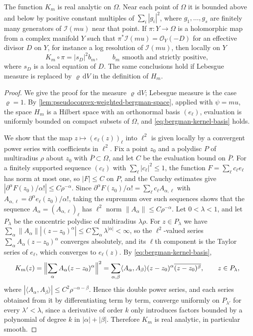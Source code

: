 \begin{lemma}\label{lem:bergman-smoothness-and-resolution}
The function $K_m$ is real analytic on $\Omega$. Near each point of $\Omega$ it is bounded above and below by positive constant multiples of $\sum_i|g_i|^2$, where $g_1,\ldots,g_s$ are finitely many generators of $\mathcal I(mu)$ near that point. If $\pi\colon Y\to\Omega$ is a holomorphic map from a complex manifold $Y$ such that $\pi^*\mathcal I(mu)=\mathcal O_Y(-D)$ for an effective divisor $D$ on $Y$, for instance a log resolution of $\mathcal I(mu)$, then locally on $Y$
\[
 K_m\circ\pi=|s_D|^2b_m,\qquad b_m\text{ smooth and strictly positive},
\]
where $s_D$ is a local equation of $D$. The same conclusions hold if Lebesgue measure is replaced by $\varrho\,\mathrm dV$ in the definition of $H_m$.
\end{lemma}
\begin{proof}
We give the proof for the measure $\varrho\,\mathrm dV$; Lebesgue measure is the case $\varrho=1$. By \cref{lem:pseudoconvex-weighted-bergman-space}, applied with $\psi=mu$, the space $H_m$ is a Hilbert space with an orthonormal basis $(e_\ell)$, evaluation is uniformly bounded on compact subsets of $\Omega$, and \eqref{eq:bergman-kernel-basis} holds.

We show that the map $z\mapsto(e_\ell(z))_\ell$ into $\ell^2$ is given locally by a convergent power series with coefficients in $\ell^2$. Fix a point $z_0$ and a polydisc $P$ of multiradius $\rho$ about $z_0$ with $\overline P\subset\Omega$, and let $C$ be the evaluation bound on $\overline P$. For a finitely supported sequence $(c_\ell)$ with $\sum_\ell|c_\ell|^2\leq1$, the function $F=\sum_\ell c_\ell e_\ell$ has norm at most one, so $|F|\leq C$ on $P$, and the Cauchy estimates give $|\partial^\alpha F(z_0)/\alpha!|\leq C\rho^{-\alpha}$. Since $\partial^\alpha F(z_0)/\alpha!=\sum_\ell c_\ell A_{\alpha,\ell}$ with $A_{\alpha,\ell}=\partial^\alpha e_\ell(z_0)/\alpha!$, taking the supremum over such sequences shows that the sequence $A_\alpha=(A_{\alpha,\ell})_\ell$ has $\ell^2$ norm $\|A_\alpha\|\leq C\rho^{-\alpha}$. Let $0<\lambda<1$, and let $P_\lambda$ be the concentric polydisc of multiradius $\lambda\rho$. For $z\in P_\lambda$ we have $\sum_\alpha\|A_\alpha\||(z-z_0)^\alpha|\leq C\sum_\alpha\lambda^{|\alpha|}<\infty$, so the $\ell^2$-valued series $\sum_\alpha A_\alpha(z-z_0)^\alpha$ converges absolutely, and its $\ell$th component is the Taylor series of $e_\ell$, which converges to $e_\ell(z)$. By \eqref{eq:bergman-kernel-basis},
\[
 K_m(z)=\Bigl\|\sum_\alpha A_\alpha(z-z_0)^\alpha\Bigr\|^2=\sum_{\alpha,\beta}\langle A_\alpha,A_\beta\rangle(z-z_0)^\alpha\overline{(z-z_0)^\beta},\qquad z\in P_\lambda,
\]
where $|\langle A_\alpha,A_\beta\rangle|\leq C^2\rho^{-\alpha-\beta}$. Hence this double power series, and each series obtained from it by differentiating term by term, converge uniformly on $P_{\lambda'}$ for every $\lambda'<\lambda$, since a derivative of order $k$ only introduces factors bounded by a polynomial of degree $k$ in $|\alpha|+|\beta|$. Therefore $K_m$ is real analytic, in particular smooth.


\end{proof}
